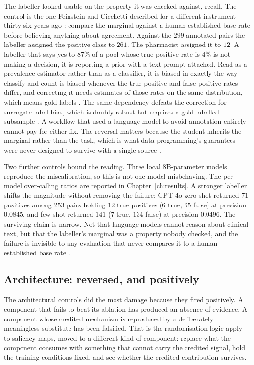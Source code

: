 The labeller looked usable on the property it was checked against, recall. The
control is the one Feinstein and Cicchetti described for a different instrument
thirty-six years ago \citep{feinstein1990paradoxes,cicchetti1990resolving}:
compare the marginal against a human-established base rate before believing
anything about agreement. Against the $299$ annotated pairs the labeller assigned
the positive class to $261$. The pharmacist assigned it to $12$. A labeller that
says yes to $87\%$ of a pool whose true positive rate is $4\%$ is not making a
decision, it is reporting a prior with a text prompt attached. Read as a
prevalence estimator rather than as a classifier, it is biased in exactly the
way classify-and-count is biased whenever the true positive and false positive
rates differ, and correcting it needs estimates of those rates on the same
distribution, which means gold labels \citep{forman2008quantifying}. The same
dependency defeats the correction for surrogate label bias, which is doubly
robust but requires a gold-labelled subsample \citep{egami2023surrogates}. A
workflow that used a language model to avoid annotation entirely cannot pay for
either fix. The reversal
matters because the student inherits the marginal rather than the task, which is
what data programming's guarantees were never designed to survive with a single
source \citep{ratner2016dataprogramming,ratner2017snorkel,zhang2022wssurvey}.

Two further controls bound the reading. Three local 8B-parameter models reproduce
the miscalibration, so this is not one model misbehaving. The per-model over-calling ratios are reported in Chapter~\ref{ch:results}. A stronger labeller shifts the magnitude without removing
the failure: GPT-4o zero-shot returned $71$ positives among $253$ pairs holding
$12$ true positives ($6$ true, $65$ false) at precision $0.0845$, and few-shot
returned $141$ ($7$ true, $134$ false) at precision $0.0496$. The surviving claim
is narrow. Not that language models cannot reason about clinical text, but that
the labeller's marginal was a property nobody checked, and the failure is
invisible to any evaluation that never compares it to a human-established base
rate \citep{pangakis2023validation}.

\subsection{Architecture: reversed, and positively}

The architectural controls did the most damage because they fired positively. A
component that fails to beat its ablation has produced an absence of evidence. A
component whose credited mechanism is reproduced by a deliberately meaningless
substitute has been falsified. That is the randomisation logic
\citet{adebayo2018sanity} apply to saliency maps, moved to a different kind of
component: replace what the component consumes with something that cannot carry
the credited signal, hold the training conditions fixed, and see whether the
credited contribution survives.


